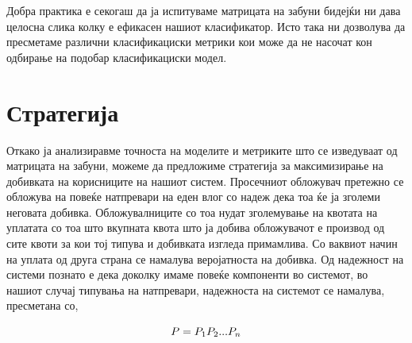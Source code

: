 \begin{table}[H]
 \centering
\caption{Изведени метрики од матрица на забуни за множество 50}
\label{table:metrics_50}
\end{table}

Добра практика е секогаш да ја испитуваме матрицата на забуни бидејќи ни дава целосна слика колку е ефикасен нашиот класификатор. Исто така ни дозволува да пресметаме различни класификациски метрики кои може да не насочат кон одбирање на подобар класификациски модел. 

\section{Стратегија}

Откако ја анализиравме точноста на моделите и метриките што се изведуваат од матрицата на забуни, можеме да предложиме стратегија за максимизирање на добивката на корисниците на нашиот систем. Просечниот обложувач претежно се обложува на повеќе натпревари на еден влог со надеж дека тоа ќе ја зголеми неговата добивка. Обложувалниците со тоа нудат зголемување на квотата на уплатата со тоа што вкупната квота што ја добива обложувачот е производ од сите квоти за кои тој типува и добивката изгледа примамлива. Со ваквиот начин на уплата од друга страна се намалува веројатноста на добивка. Од надежност на системи \cite{fussell1975hand} познато е дека доколку имаме повеќе компоненти во системот, во нашиот случај типувања на натпревари, надежноста на системот се намалува, пресметана со,

\begin{equation}
P= P_1\\P_2\\...P_n
\end{equation}

